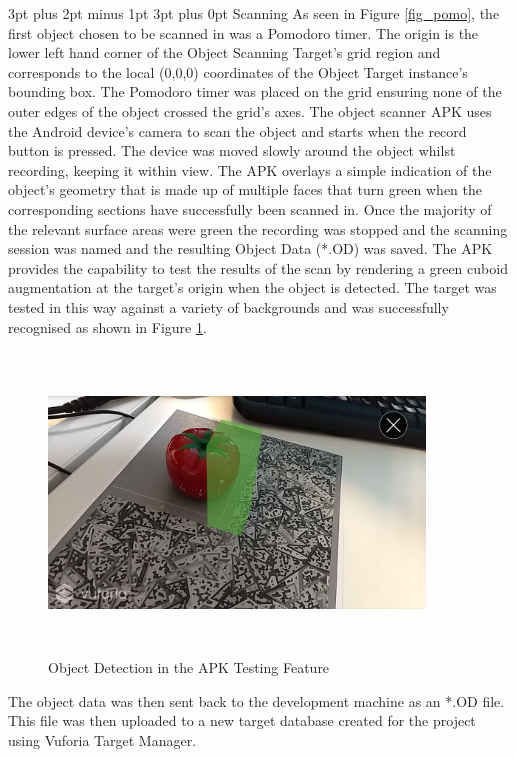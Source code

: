 \documentclass[12pt,a4paper,oneside]{article}
\makeatletter
\renewcommand\paragraph{\@startsection {paragraph}{1}{0mm} %
	                           {3pt plus 2pt minus 1pt} %
	                           {3pt plus 0pt} %
	                           {\normalfont}}
\makeatother
\begin{document}
\paragraph{Scanning}
As seen in Figure \ref{fig_pomo}, the first object chosen to be scanned in was a Pomodoro timer. The origin is the lower left hand corner of the Object Scanning Target's grid region and corresponds to the local (0,0,0) coordinates of the Object Target instance's bounding box. The Pomodoro timer was placed on the grid ensuring none of the outer edges of the object crossed the grid's axes. The object scanner APK uses the Android device's camera to scan the object and starts when the record button is pressed. The device was moved slowly around the object whilst recording, keeping it within view. The APK overlays a simple indication of the object's geometry that is made up of multiple faces that turn green when the corresponding sections have successfully been scanned in. Once the majority of the relevant surface areas were green the recording was stopped and the scanning session was named and the resulting Object Data (*.OD) was saved. The APK provides the capability to test the results of the scan by rendering a green cuboid augmentation at the target's origin when the object is detected. The target was tested in this way against a variety of backgrounds and was successfully recognised as shown in Figure \ref{fig_detection}. 

\begin{figure}[!h]
	\centering
	\includegraphics[width=10cm,height=8cm,keepaspectratio]{images/detection}
	\caption[Detection in APK Test]{Object Detection in the APK Testing Feature}
	\label{fig_detection}
\end{figure}

The object data was then sent back to the development machine as an *.OD file. This file was then uploaded to a new target database created for the project using Vuforia Target Manager.
\end{document}
